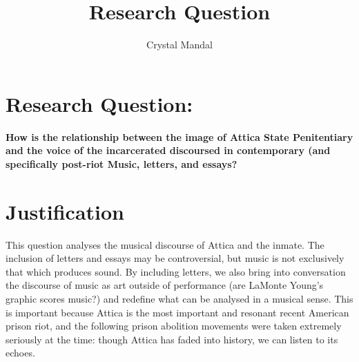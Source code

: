 \documentclass[12pt,letterpaper]{article}
\title{\vspace*{-72pt}Research Question}
\author{Crystal Mandal}
\date{}
\begin{document}
\maketitle

\section*{Research Question:}
\textbf{How is the relationship between the image of Attica State Penitentiary 
and the voice of the incarcerated discoursed in contemporary (and specifically 
post-riot Music, letters, and essays?}

\section*{Justification}

This question analyses the musical discourse of Attica and the inmate. The 
inclusion of letters and essays may be controversial, but music is not exclusively 
that which produces sound. By including letters, we also bring into conversation 
the discourse of music as art outside of performance (are LaMonte Young's graphic 
scores music?) and redefine what can be analysed in a musical sense. This is 
important because Attica is the most important and resonant recent American 
prison riot, and the following prison abolition movements were taken extremely 
seriously at the time: though Attica has faded into history, we can listen to 
its echoes. 


\end{document}
